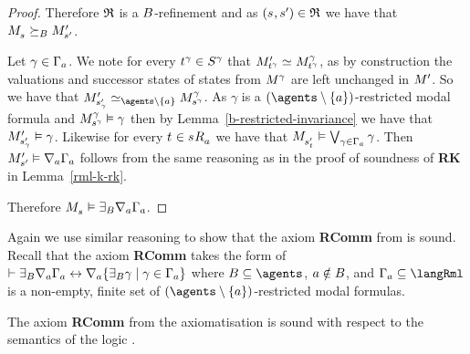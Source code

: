 \begin{proof}
Therefore $\refinement$ is a $\agentsB$-refinement and as $(\kStateS, \kStateSP) \in \refinement$ we have that $\kPModel{\kStateS} \simulatesBs \kPModelP{\kStateSP}$.

Let $\gamma \in \Gamma_\agentA$.
We note for every $\kStateT[\gamma] \in \kStates[\gamma]$ that $\kPModelP{\kStateT[\gamma]} \bisimilar \kPModel[\gamma]{\kStateT[\gamma]}$, as by construction the valuations and successor states of states from $\kModel[\gamma]$ are left unchanged in $\kModelP$.
So we have that $\kPModelP{\kStateSP_\gamma} \bisimilar[\agents \setminus \{\agentA\}] \kPModel[\gamma]{\kStateS[\gamma]}$.
As $\gamma$ is a $(\agents \setminus \{\agentA\})$-restricted modal formula and $\kPModel[\gamma]{\kStateS[\gamma]} \entails \gamma$ then by Lemma~\ref{b-restricted-invariance} we have that $\kPModelP{\kStateSP_\gamma} \entails \gamma$.
Likewise for every $\kStateT \in \kSuccessorsA{\kStateS}$ we have that $\kPModel{\kStateSP_{\kStateT}} \entails \bigvee_{\gamma \in \Gamma_\agentA} \gamma$.
Then $\kPModelP{\kStateSP} \entails \coversA \Gamma_\agentA$ follows from the same reasoning as in the proof of soundness of {\bf RK} in Lemma~\ref{rml-k-rk}.

Therefore $\kPModel{\kStateS} \entails \somerefsBs \coversA \Gamma_\agentA$.
\end{proof}

Again we use similar reasoning to show that the axiom {\bf RComm} from \axiomRmlKD{} is sound.
Recall that the axiom {\bf RComm} takes the form of $\proves \somerefsBs \coversA \Gamma_\agentA \iff \coversA \{\somerefsBs \gamma \mid \gamma \in \Gamma_\agentA\}$ where $\agentsB \subseteq \agents$, $\agentA \notin \agentsB$, and $\Gamma_\agentA \subseteq \langRml$ is a non-empty, finite set of $(\agents \setminus \{\agentA\})$-restricted modal formulas.

\begin{lemma}\label{rml-kd45-rcomm}
The axiom {\bf RComm} from the axiomatisation \axiomRmlKD{} is sound with respect to the semantics of the logic \logicRmlKD{}.
\end{lemma}

